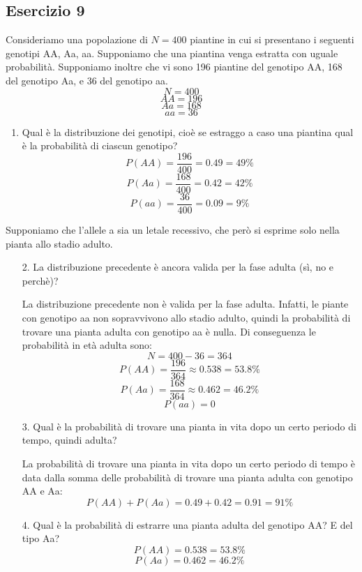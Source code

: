 \documentclass[a4paper]{article}
\theoremstyle{break}
\theoremstyle{break}
\theoremstyle{break}
\theoremstyle{break}
\begin{document}
\subsection{Esercizio 9}
Consideriamo una popolazione di \( N = 400 \) piantine in cui si presentano i seguenti 
genotipi AA, Aa, aa. Supponiamo che una piantina venga estratta con uguale probabilità.
Supponiamo inoltre che vi sono 196 piantine del genotipo AA, 168 del genotipo Aa, e 36 
del genotipo aa.
\[
  N = 400
\] 
\[
  AA = 196
\] 
\[
  Aa = 168
\] 
\[
  aa = 36
\] 
\begin{enumerate}
  \item Qual è la distribuzione dei genotipi, cioè se estraggo a caso una piantina qual 
    è la probabilità di ciascun genotipo?
    \[
    P(AA) = \frac{196}{400} = 0.49 = 49\%
    \] 
    \[
    P(Aa) = \frac{168}{400} = 0.42 = 42\%
    \] 
    \[
    P(aa) = \frac{36}{400} = 0.09 = 9\%
    \] 
\end{enumerate}
Supponiamo che l’allele a sia un letale recessivo, che però si esprime solo nella pianta 
allo stadio adulto.
\begin{enumerate}
  \item[2.] La distribuzione precedente è ancora valida per la fase adulta (sì, no 
    e perchè)?

    \vspace{1em}
    \noindent La distribuzione precedente non è valida per la fase adulta. Infatti,
    le piante con genotipo aa non sopravvivono allo stadio adulto, quindi la probabilità
    di trovare una pianta adulta con genotipo aa è nulla. Di conseguenza le probabilità
    in età adulta sono:
    \[
    N = 400 - 36 = 364
    \] 
    \[
    P(AA) = \frac{196}{364} \approx 0.538 = 53.8\%
    \] 
    \[
    P(Aa) = \frac{168}{364} \approx 0.462 = 46.2\%
    \] 
    \[
    P(aa) = 0
    \] 
  \item[3.] Qual è la probabilità di trovare una pianta in vita dopo un certo periodo di 
    tempo, quindi adulta?
    
    \vspace{1em}
    \noindent La probabilità di trovare una pianta in vita dopo un certo periodo di tempo
    è data dalla somma delle probabilità di trovare una pianta adulta con genotipo AA e
    Aa:
    \[
    P(AA) + P(Aa) = 0.49 + 0.42 = 0.91 = 91\%
    \] 
  \item[4.] Qual è la probabilità di estrarre una pianta adulta del genotipo AA? E del 
    tipo Aa?
    \[
      P(AA) = 0.538 = 53.8\%
    \] 
    \[
      P(Aa) = 0.462 = 46.2\%
    \]
\end{enumerate}
\end{document}
